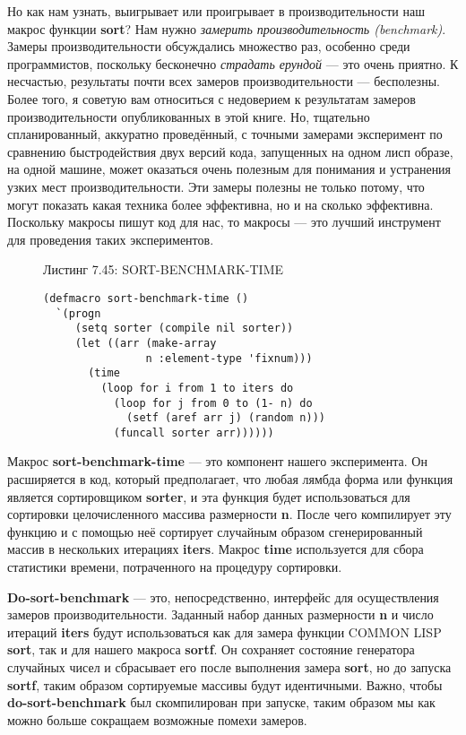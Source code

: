 Но как нам узнать, выигрывает или проигрывает в производительности наш макрос функции \textbf{sort}? Нам нужно \emph{замерить производительность (benchmark)}. Замеры производительности обсуждались множество раз, особенно среди программистов, поскольку бесконечно \emph{страдать ерундой} --- это очень приятно. К несчастью, результаты почти всех замеров производительности --- бесполезны. Более того, я советую вам относиться с недоверием к результатам замеров производительности опубликованных в этой книге. Но, тщательно спланированный, аккуратно проведённый, с точными замерами эксперимент по сравнению быстродействия двух версий кода, запущенных на одном лисп образе, на одной машине, может оказаться очень полезным для понимания и устранения узких мест производительности. Эти замеры полезны не только потому, что могут показать какая техника более эффективна, но и на сколько эффективна. Поскольку макросы пишут код для нас, то макросы --- это лучший инструмент для проведения таких экспериментов.

\begin{figure}Листинг 7.45: SORT-BENCHMARK-TIME\label{listing_7.45}
\listbegin
\begin{verbatim}
(defmacro sort-benchmark-time ()
  `(progn
     (setq sorter (compile nil sorter))
     (let ((arr (make-array
                n :element-type 'fixnum)))
       (time
         (loop for i from 1 to iters do
           (loop for j from 0 to (1- n) do
             (setf (aref arr j) (random n)))
           (funcall sorter arr))))))
\end{verbatim}
\listend
\end{figure}

Макрос \textbf{sort-benchmark-time} --- это компонент нашего эксперимента. Он расширяется в код, который предполагает, что любая лямбда форма или функция является сортировщиком \textbf{sorter}, и эта функция будет использоваться для сортировки целочисленного массива размерности \textbf{n}. После чего компилирует эту функцию и с помощью неё сортирует случайным образом сгенерированный массив в нескольких итерациях \textbf{iters}. Макрос \textbf{time} используется для сбора статистики времени, потраченного на процедуру сортировки.

\textbf{Do-sort-benchmark} --- это, непосредственно, интерфейс для осуществления замеров производительности. Заданный набор данных размерности \textbf{n} и число итераций \textbf{iters} будут использоваться как для замера функции COMMON LISP \textbf{sort}, так и для нашего макроса \textbf{sortf}. Он сохраняет состояние генератора случайных чисел и сбрасывает его после выполнения замера \textbf{sort}, но до запуска \textbf{sortf}, таким образом сортируемые массивы будут идентичными. Важно, чтобы \textbf{do-sort-benchmark} был скомпилирован при запуске, таким образом мы как можно больше сокращаем возможные помехи замеров.

